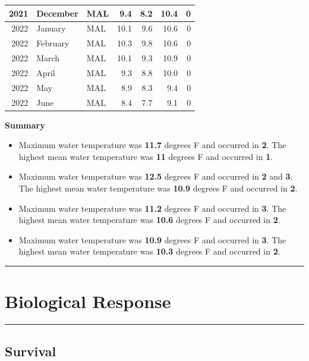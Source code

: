 \documentclass[
]{book}
\providecommand{\tightlist}{%
  \setlength{\itemsep}{0pt}\setlength{\parskip}{0pt}}
\theoremstyle{definition}
\theoremstyle{definition}
\theoremstyle{definition}
\theoremstyle{definition}
\theoremstyle{remark}
\begin{document}
\begin{table}
\begin{tabular}[t]{rllrrrr}
\hline
2021 & December & MAL & 9.4 & 8.2 & 10.4 & 0\\
\hline
2022 & January & MAL & 10.1 & 9.6 & 10.6 & 0\\
\hline
2022 & February & MAL & 10.3 & 9.8 & 10.6 & 0\\
\hline
2022 & March & MAL & 10.1 & 9.3 & 10.9 & 0\\
\hline
2022 & April & MAL & 9.3 & 8.8 & 10.0 & 0\\
\hline
2022 & May & MAL & 8.9 & 8.3 & 9.4 & 0\\
\hline
2022 & June & MAL & 8.4 & 7.7 & 9.1 & 0\\
\hline
\end{tabular}
\end{table}

\textbf{Summary}

\begin{itemize}
\tightlist
\item
  Maximum water temperature was \textbf{11.7} degrees F and occurred in \textbf{2}. The highest mean water temperature was \textbf{11} degrees F and occurred in \textbf{1}.
\item
  Maximum water temperature was \textbf{12.5} degrees F and occurred in \textbf{2} and \textbf{3}. The highest mean water temperature was \textbf{10.9} degrees F and occurred in \textbf{2}.
\item
  Maximum water temperature was \textbf{11.2} degrees F and occurred in \textbf{3}. The highest mean water temperature was \textbf{10.6} degrees F and occurred in \textbf{2}.
\item
  Maximum water temperature was \textbf{10.9} degrees F and occurred in \textbf{3}. The highest mean water temperature was \textbf{10.3} degrees F and occurred in \textbf{2}.
\end{itemize}

\begin{center}\rule{0.5\linewidth}{0.5pt}\end{center}

\hypertarget{biological-response-4}{%
\section{Biological Response}\label{biological-response-4}}

\begin{center}\rule{0.5\linewidth}{0.5pt}\end{center}

\hypertarget{survival}{%
\subsection{Survival}\label{survival}}
\end{document}
